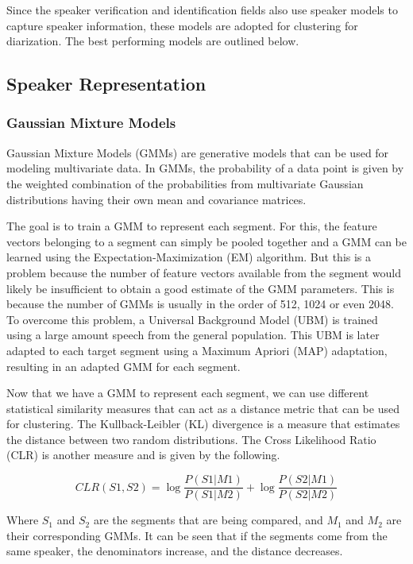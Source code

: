 	Since the speaker verification and identification fields also use speaker models to capture speaker information, these models are adopted for clustering for diarization. The best performing models are outlined below.
	
	\subsection{Speaker Representation}
		\subsubsection{Gaussian Mixture Models}
		Gaussian Mixture Models (GMMs) are generative models that can be used for modeling multivariate data. In GMMs, the probability of a data point is given by the weighted combination of the probabilities from multivariate Gaussian distributions having their own mean and covariance matrices.
		
		The goal is to train a GMM to represent each segment. For this, the feature vectors belonging to a segment can simply be pooled together and a GMM can be learned using the Expectation-Maximization (EM) \cite{moon1996expectation} algorithm. But this is a problem because the number of feature vectors available from the segment would likely be insufficient to obtain a good estimate of the GMM parameters. This is because the number of GMMs is usually in the order of 512, 1024 or even 2048. To overcome this problem, a Universal Background Model (UBM) is trained using a large amount speech from the general population. This UBM is later adapted to each target segment using a Maximum Apriori (MAP) adaptation, resulting in an adapted GMM for each segment.
		
		Now that we have a GMM to represent each segment, we can use different statistical similarity measures that can act as a distance metric that can be used for clustering. The Kullback-Leibler (KL) divergence \cite{kullback1997information} is a measure that estimates the distance between two random distributions. The Cross Likelihood Ratio (CLR) is another measure and is given by the following.
		
		$$ CLR(S1, S2) = \log\frac{P(S1|M1)}{P(S1|M2)} + \log\frac{P(S2|M1)}{P(S2|M2)} $$
		
		Where $S_1$ and $S_2$ are the segments that are being compared, and $M_1$ and $M_2$ are their corresponding GMMs. It can be seen that if the segments come from the same speaker, the denominators increase, and the distance decreases.
		
